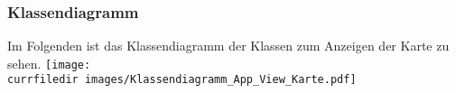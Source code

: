 \begin{samepage}
\subsubsection{Klassendiagramm}
Im Folgenden ist das Klassendiagramm der Klassen zum Anzeigen der Karte zu sehen.
\texttt{[image: \\currfiledir images/Klassendiagramm\_App\_View\_Karte.pdf]}

\end{samepage}